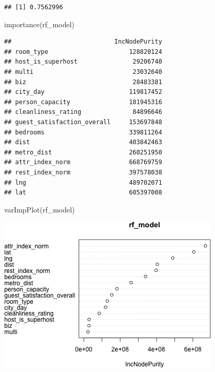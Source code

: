 \documentclass[
]{article}
\newenvironment{Shaded}{\begin{snugshade}}{\end{snugshade}}
\newcommand{\FunctionTok}[1]{\textcolor[rgb]{0.00,0.00,0.00}{#1}}
\newcommand{\NormalTok}[1]{#1}
\begin{document}
\begin{verbatim}
## [1] 0.7562996
\end{verbatim}

\begin{Shaded}
\begin{Highlighting}[]
\FunctionTok{importance}\NormalTok{(rf\_model)}
\end{Highlighting}
\end{Shaded}

\begin{verbatim}
##                            IncNodePurity
## room_type                      128820124
## host_is_superhost               29206740
## multi                           23032640
## biz                             28483381
## city_day                       119817452
## person_capacity                181945316
## cleanliness_rating              84896646
## guest_satisfaction_overall     153697848
## bedrooms                       339811264
## dist                           403842463
## metro_dist                     260251950
## attr_index_norm                668769759
## rest_index_norm                397578038
## lng                            489702071
## lat                            605397008
\end{verbatim}

\begin{Shaded}
\begin{Highlighting}[]
\FunctionTok{varImpPlot}\NormalTok{(rf\_model)}
\end{Highlighting}
\end{Shaded}

\includegraphics{Project_files/figure-latex/unnamed-chunk-88-1.png}
\end{document}
